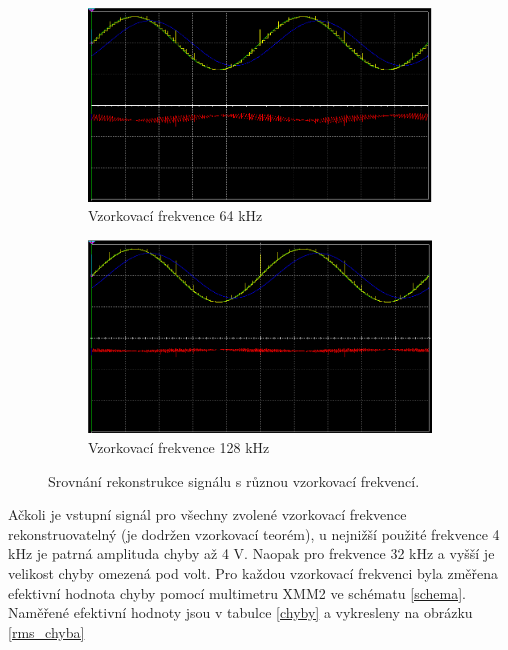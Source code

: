 \documentclass[twoside]{article}
\begin{document}
\begin{figure}[h]
    \begin{subfigure}{0.45\textwidth}
        \includegraphics[width=\textwidth]{rekonstrukce-64kHz.png}
        \caption{Vzorkovací frekvence 64 kHz}
    \end{subfigure}
    \begin{subfigure}{0.45\textwidth}
        \includegraphics[width=\textwidth]{rekonstrukce-128kHz.png}
        \caption{Vzorkovací frekvence 128 kHz}
    \end{subfigure}
    \caption{Srovnání rekonstrukce signálu s různou vzorkovací frekvencí.}
    \label{srovnani-frekvenci}
\end{figure}

Ačkoli je vstupní signál pro všechny zvolené vzorkovací frekvence
rekonstruovatelný (je dodržen vzorkovací teorém),
u nejnižší použité frekvence 4 kHz je patrná amplituda chyby
až 4 V. Naopak pro frekvence 32 kHz a vyšší je velikost chyby omezená 
pod volt. Pro každou vzorkovací frekvenci byla změřena efektivní hodnota chyby
pomocí multimetru XMM2 ve schématu \ref{schema}. Naměřené efektivní hodnoty
jsou v tabulce \ref{chyby} a vykresleny na obrázku \ref{rms_chyba}
\end{document}
